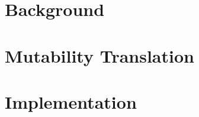 
\tableofcontents


\chapter{Background}



\chapter{Mutability Translation}
\label{translation}



\chapter{Implementation}
\label{implementation}
%
